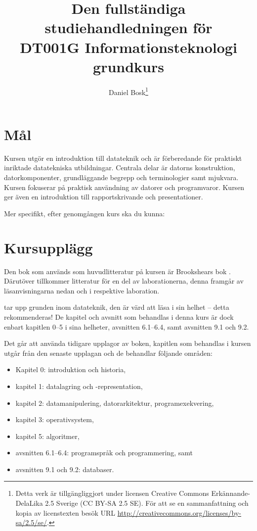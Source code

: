 \documentclass[a4paper,logo]{miunart}
\title{Den fullständiga studiehandledningen för\\
DT001G Informationsteknologi grundkurs}
\author{
  Daniel Bosk\footnote{%
    Detta verk är tillgängliggjort under licensen Creative Commons 
    Erkännande-DelaLika 2.5 Sverige (CC BY-SA 2.5 SE).
    För att se en sammanfattning och kopia av licenstexten besök URL 
    \url{http://creativecommons.org/licenses/by-sa/2.5/se/}.
  }
}
\date{\svnId}
\begin{document}
\maketitle
\tableofcontents


\section{Mål}
\label{sec:aim}
Kursen utgör en introduktion till datateknik och är förberedande för praktiskt 
inriktade datatekniska utbildningar.
Centrala delar är datorns konstruktion, datorkomponenter, grundläggande begrepp 
och terminologier samt mjukvara.
Kursen fokuserar på praktisk användning av datorer och programvaror.
Kursen ger även en introduktion till rapportskrivande och presentationer.

Mer specifikt, efter genomgången kurs ska du kunna:
\begin{itemize}
    
    
    
    
    
\end{itemize}


\section{Kursupplägg}
\label{sec:outline}
Den bok som används som huvudlitteratur på kursen är Brookshears bok 
 \cite{Brookshear2012csa}.
Därutöver tillkommer litteratur för en del av laborationerna, denna framgår av 
läsanvisningarna nedan och i respektive laboration.

\citet{Brookshear2012csa} tar upp grunden inom datateknik, den är värd att läsa 
i sin helhet -- detta rekommenderas!
De kapitel och avsnitt som behandlas i denna kurs är dock enbart kapitlen 0--5 
i sina helheter, avsnitten 6.1--6.4, samt avsnitten 9.1 och 9.2.

Det går att använda tidigare upplagor av boken, kapitlen som behandlas i kursen 
utgår från den senaste upplagan \citep{Brookshear2012csa} och de behandlar 
följande områden:
\begin{itemize}
  \item Kapitel 0: introduktion och historia,
  \item kapitel 1: datalagring och -representation,
  \item kapitel 2: datamanipulering, datorarkitektur, programexekvering,
  \item kapitel 3: operativsystem,
  \item kapitel 5: algoritmer,
  \item avsnitten 6.1--6.4: programspråk och programmering, samt
  \item avsnitten 9.1 och 9.2: databaser.
\end{itemize}
\end{document}
